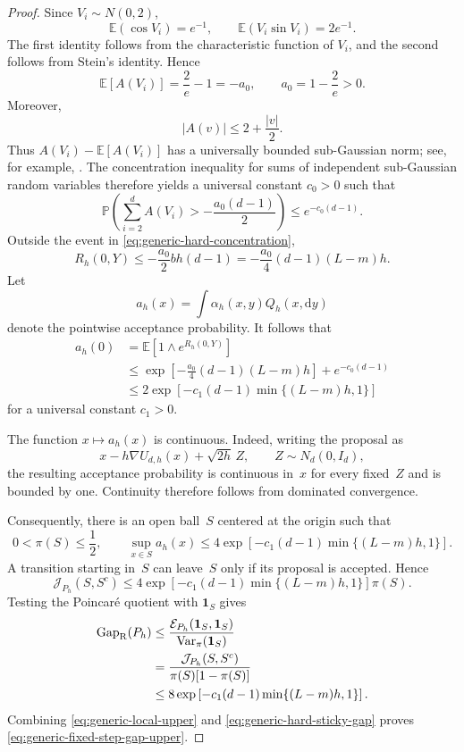 \documentclass[11pt]{article}
\newcommand{\E}{\mathbb E}
\newcommand{\Var}{\operatorname{Var}}
\newcommand{\Gap}{\operatorname{Gap}_{\mathrm{R}}}
\newcommand{\cE}{\mathcal E}
\newcommand{\abs}[1]{\left\lvert #1\right\rvert}
\newcommand{\1}{\mathbf 1}
\newcommand{\df}{\mathrm{d}}
\begin{document}
\begin{proof}
		Since $V_i\sim N(0,2)$,
		\[
		\E(\cos V_i)=e^{-1},
		\qquad
		\E(V_i\sin V_i)=2e^{-1}.
		\]
		The first identity follows from the characteristic function of
		$V_i$, and the second follows from Stein's identity.  Hence
		\begin{equation*}
			\E[A(V_i)]
			=\frac2e-1
			=-a_0,
			\qquad
			a_0=1-\frac2e>0.
		\end{equation*}
		Moreover,
		\[
		\abs{A(v)}\leq2+\frac{\abs v}{2}.
		\]
		Thus $A(V_i)-\E[A(V_i)]$ has a universally bounded
		sub-Gaussian norm; see, for example,
		\citep[Section~2.5.2]{Vershynin2018}.  The concentration
		inequality for sums of independent sub-Gaussian random variables
		\citep[Theorem~2.6.3]{Vershynin2018} therefore yields a universal
		constant $c_0>0$ such that
		\begin{equation}
			\label{eq:generic-hard-concentration}
			\mathbb P\left(
			\sum_{i=2}^d A(V_i)
			>-\frac{a_0(d-1)}{2}
			\right)
			\leq e^{-c_0(d-1)}.
		\end{equation}
		Outside the event in \eqref{eq:generic-hard-concentration},
		\[
		R_h(0,Y)
		\leq
		-\frac{a_0}{2}bh(d-1)
		=
		-\frac{a_0}{4}(d-1)(L-m)h.
		\]
		Let
		\[
		a_h(x)=\int\alpha_h(x,y)Q_h(x,\df y)
		\]
		denote the pointwise acceptance probability.  It follows that
		\begin{align*}
			a_h(0)
			&=\E\left[1\wedge e^{R_h(0,Y)}\right]
			\\
			&\leq
			\exp\left[
			-\frac{a_0}{4}(d-1)(L-m)h
			\right]
			+e^{-c_0(d-1)}
			\\
			&\leq
			2\exp\left[
			-c_1(d-1)\min\{(L-m)h,1\}
			\right]
		\end{align*}
		for a universal constant $c_1>0$.
		
		The function $x\mapsto a_h(x)$ is continuous.  Indeed, writing
		the proposal as
		\[
		x-h\nabla U_{d,h}(x)+\sqrt{2h}\,Z,
		\qquad Z\sim N_d(0,I_d),
		\]
		the resulting acceptance probability is continuous in~$x$ for
		every fixed~$Z$ and is bounded by one.  Continuity therefore
		follows from dominated convergence.
		
		Consequently, there is an open ball~$S$ centered at the origin
		such that
		\[
		0<\pi(S)\leq\frac12,
		\qquad
		\sup_{x\in S}a_h(x)
		\leq
		4\exp\left[
		-c_1(d-1)\min\{(L-m)h,1\}
		\right].
		\]
		A transition starting in~$S$ can leave~$S$ only if its proposal
		is accepted.  Hence
		\[
		\mathcal{J}_{P_h}(S,S^c)
		\leq
		4\exp\left[
		-c_1(d-1)\min\{(L-m)h,1\}
		\right]\pi(S).
		\]
		Testing the Poincar\'e quotient with $\mathbf 1_S$ gives
		\begin{align}
			\Gap(P_h)
			&\leq
			\frac{\cE_{P_h}(\mathbf 1_S,\mathbf 1_S)}
			{\Var_\pi(\mathbf 1_S)}
			\notag\\
			&=
			\frac{\mathcal{J}_{P_h}(S,S^c)}
			{\pi(S)[1-\pi(S)]}
			\notag\\
			&\leq
			8\exp\left[
			-c_1(d-1)\min\{(L-m)h,1\}
			\right].
			\label{eq:generic-hard-sticky-gap}
		\end{align}
		Combining \eqref{eq:generic-local-upper} and
		\eqref{eq:generic-hard-sticky-gap} proves
		\eqref{eq:generic-fixed-step-gap-upper}.
		

\end{proof}
\end{document}
